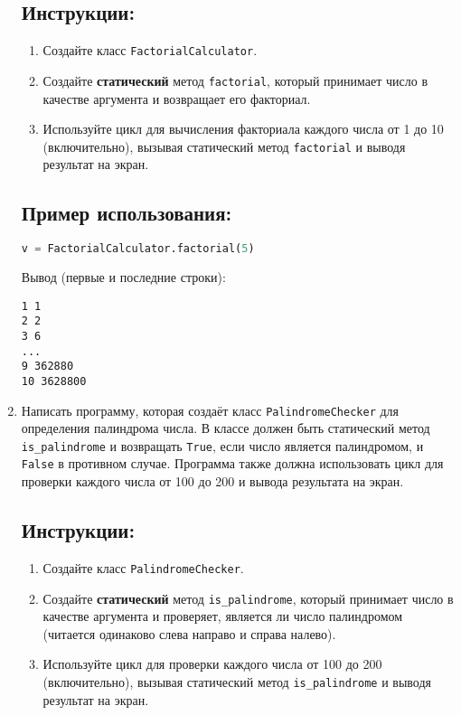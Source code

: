 \begin{enumerate}
\subsection*{Инструкции:}
\begin{enumerate}
    \item Создайте класс \texttt{FactorialCalculator}.
    \item Создайте \textbf{статический} метод \texttt{factorial}, который принимает число в качестве аргумента и возвращает его факториал.
    \item Используйте цикл для вычисления факториала каждого числа от 1 до 10 (включительно), вызывая статический метод \texttt{factorial} и выводя результат на экран.
\end{enumerate}

\subsection*{Пример использования:}
\begin{lstlisting}[language=Python]
    v = FactorialCalculator.factorial(5)
\end{lstlisting}
Вывод (первые и последние строки):
\begin{verbatim}
1 1
2 2
3 6
...
9 362880
10 3628800
\end{verbatim}

\item
Написать программу, которая создаёт класс \texttt{PalindromeChecker} 
для определения палиндрома числа. В классе должен быть статический метод
\texttt{is\_palindrome} и возвращать \texttt{True}, если число является палиндромом, 
и \texttt{False} в противном случае. 
Программа также должна использовать цикл для проверки каждого числа от 
100 до 200 и вывода результата на экран.

\subsection*{Инструкции:}
\begin{enumerate}
    \item Создайте класс \texttt{PalindromeChecker}.
    \item Создайте \textbf{статический} метод \texttt{is\_palindrome}, который принимает число в качестве аргумента и проверяет, является ли число палиндромом (читается одинаково слева направо и справа налево).
    \item Используйте цикл для проверки каждого числа от 100 до 200 (включительно), вызывая статический метод \texttt{is\_palindrome} и выводя результат на экран.
\end{enumerate}


\end{enumerate}
